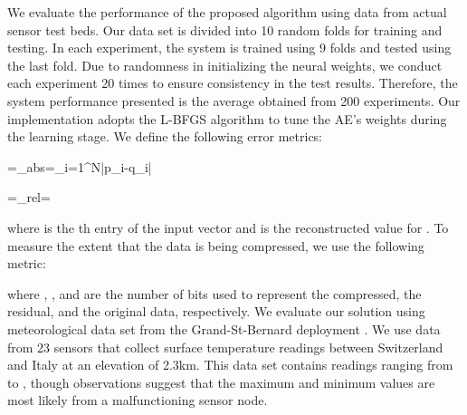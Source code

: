 \documentclass[a4paper,onecolumn,conference]{IEEEtran}
\begin{document}
We evaluate the performance of the proposed algorithm using data from actual sensor test beds. Our data set is divided into 10 random folds for training and testing. In each experiment, the system is trained using 9 folds and tested using the last fold. Due to randomness in initializing the neural weights, we conduct each experiment 20 times to ensure consistency in the test results. Therefore, the system performance presented is the average obtained from 200 experiments. Our implementation adopts the L-BFGS algorithm \cite{byrd1995limited} to tune the AE's weights during the learning stage. We define the following error metrics:

=\epsilon_{abs}=\sum_{i=1}^{N}\left|p_{i}-q_{i}\right|

=\epsilon_{rel}=

where  is the th entry of the input vector  and  is the reconstructed value for . To measure the extent that the data is being compressed, we use the following metric:

where , , and  are the number of bits used to represent the compressed, the residual, and the original data, respectively. We evaluate our solution using meteorological data set from the Grand-St-Bernard deployment \cite{Sensorscope_Grand}. We use data from 23 sensors that collect surface temperature readings between Switzerland and Italy at an elevation of 2.3km. This data set contains readings ranging from  to , though observations suggest that the maximum and minimum values are most likely from a malfunctioning sensor node.
\end{document}
